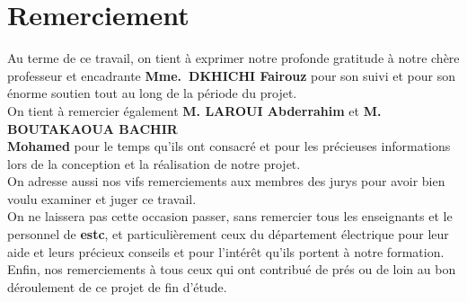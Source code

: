 \chapter*{Remerciement}

Au terme de ce travail, on tient à exprimer notre profonde gratitude à notre chère professeur et encadrante \textbf{Mme.\ DKHICHI Fairouz} pour son suivi et pour son énorme soutien %
tout au long de la période du projet. \\
On tient à remercier également \textbf{M. LAROUI Abderrahim} et \textbf{M. BOUTAKAOUA BACHIR\\Mohamed} pour le temps qu’ils ont consacré et pour les précieuses informations lors de la conception et la réalisation de notre projet. \\
On adresse aussi nos vifs remerciements aux membres des jurys pour avoir bien voulu examiner et juger ce travail. \\
On ne laissera pas cette occasion passer, sans remercier tous les enseignants et le personnel de \textbf{\acrfull{estc}}, et particulièrement ceux du département électrique pour leur aide et leurs précieux conseils et pour l’intérêt qu’ils portent à notre formation. \\
Enfin, nos remerciements à tous ceux qui ont contribué de prés ou de loin au bon déroulement de ce projet de fin d'étude.
